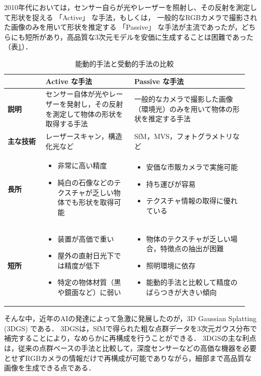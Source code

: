 \documentclass[a4paper,dvipdfmx,ja=standard,9pt]{bxjsarticle}
\begin{document}
2010年代においては，センサー自らが光やレーザーを照射し、その反射を測定して形状を捉える 「Active」 な手法，もしくは，
一般的なRGBカメラで撮影された画像のみを用いて形状を推定する 「Passive」 な手法が主流であったが，どちらにも短所があり，高品質な3次元モデルを安価に生成することは困難であった
（表\ref{tab:active_passive}）．

\begin{table}[htbp]
  \centering
  \caption{能動的手法と受動的手法の比較}
  \begin{tabular}{p{0.15\linewidth}|p{0.35\linewidth}|p{0.45\linewidth}}
    \toprule
    \textbf{} & \textbf{Active な手法} & \textbf{Passive な手法} \\
    \midrule
    \textbf{説明} & センサー自体が光やレーザーを発射し，その反射を測定して物体の形状を取得する手法 & 一般的なカメラで撮影した画像（環境光）のみを用いて物体の形状を推定する手法 \\
    \midrule
    \textbf{主な技術} & レーザースキャン，構造化光など & SfM，MVS，フォトグラメトリなど \\
    \midrule
    \textbf{長所} & 
    \begin{itemize}[leftmargin=*,nosep]
      \item 非常に高い精度
      \item 純白の石像などのテクスチャが乏しい物体でも形状を取得可能
    \end{itemize} &
    \begin{itemize}[leftmargin=*,nosep]
      \item 安価な市販カメラで実施可能
      \item 持ち運びが容易
      \item テクスチャ情報の取得に優れている
    \end{itemize} \\
    \midrule
    \textbf{短所} & 
    \begin{itemize}[leftmargin=*,nosep]
      \item 装置が高価で重い
      \item 屋外の直射日光下では精度が低下
      \item 特定の物体材質（黒や鏡面など）に弱い
    \end{itemize} &
    \begin{itemize}[leftmargin=*,nosep]
      \item 物体のテクスチャが乏しい場合，特徴点の抽出が困難
      \item 照明環境に依存
      \item 能動的手法と比較して精度のばらつきが大きい傾向
    \end{itemize} \\
    \bottomrule
  \end{tabular}
  \label{tab:active_passive}
\end{table}
そんな中，近年のAIの発達によって急激に発展したのが，3D Gaussian Splatting (3DGS) \cite{kerbl3Dgaussians}である．
3DGSは，SfMで得られた粗な点群データを3次元ガウス分布で補完することにより，なめらかに再構成を行うことができる．
3DGSの主な利点は，従来の点群ベースの手法と比較して，深度センサーなどの高価な機器を必要とせずRGBカメラの情報だけで再構成が可能でありながら，細部まで高品質な画像を生成できる点である．
\end{document}
